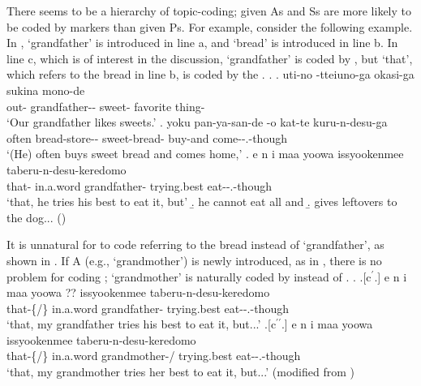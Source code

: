 There seems to be a hierarchy of topic-coding;
given As and Ss are more likely to be coded by  markers than given Ps.
For example, consider the following example.
In \Next,
 `grandfather' is introduced in line a, and
 `bread' is introduced in line b.
In line c, which is of interest in the discussion,
 `grandfather' is coded by , but
 `that', which refers to the bread in line b, is coded by the  .
%
\ex.
 \ag. uti-no -tteiuno-ga okasi-ga sukina mono-de \\
 		out- grandfather-- sweet- favorite thing- \\
		`Our grandfather likes sweets.'
 \bg. yoku pan-ya-san-de -o kat-te kuru-n-desu-ga \\
   often bread-store-- sweet-bread- buy-and come--.-though \\
   `(He) often buys sweet bread and comes home,'
 \bg. e n  i maa yoowa  issyookenmee taberu-n-desu-keredomo \\
     that-   in.a.word grandfather- trying.best eat--.-though \\
   `that, he tries his best to eat it, but'
 \b. he cannot eat all and
 \b. gives leftovers to the dog...
  \hfill{()}

It is unnatural for  to code  referring to the bread
instead of  `grandfather',
as shown in \Next[c$^{\prime}$].
If A (e.g.,  `grandmother') is newly introduced, as in ,
there is no problem for  coding ;
 `grandmother' is naturally coded by  instead of .
%
\ex.
 \ag.[c$^{\prime}$.] e n  i maa yoowa ?? issyookenmee taberu-n-desu-keredomo \\
     that-\{/\}   in.a.word grandfather- trying.best eat--.-though \\
   `that, my grandfather tries his best to eat it, but...'
  \bg.[c$^{\prime\prime}$.] e n  i maa yoowa  issyookenmee taberu-n-desu-keredomo \\
     that-\{/\}   in.a.word grandmother-/ trying.best eat--.-though \\
   `that, my grandmother tries her best to eat it, but...'
   \hfill{(modified from \Last[c])}

